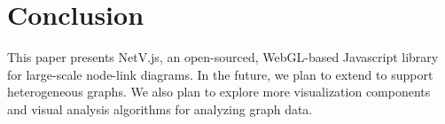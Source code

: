 \section{Conclusion}
This paper presents NetV.js, an open-sourced, WebGL-based Javascript library for large-scale node-link diagrams. In the future, we plan to extend \name to support heterogeneous graphs. We also plan to explore more visualization components and visual analysis algorithms for analyzing graph data.